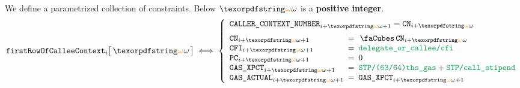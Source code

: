 We define a parametrized collection of constraints. Below $\relof$ is a \textbf{positive integer}. %
\[
	\firstRowOfCallee {i}{\relof}
	\iff
	\left\{ \begin{array}{lcl}
		\multicolumn{3}{l}{\caller  _{i + \relof + 1}          =          \cn  _{i + \relof}}                \vspace{2mm} \\
		\cn                         _{i + \relof + 1} & \!\!\! = \!\!\! & \cnCn_{i + \relof}                 \\
		\cfi                        _{i + \relof + 1} & \!\!\! = \!\!\! & \locDelegateOrCalleeCfi            \\
		\pc                         _{i + \relof + 1} & \!\!\! = \!\!\! & 0                                  \\
		\gasExpected                _{i + \relof + 1} & \!\!\! = \!\!\! & \locStpGasPoop + \locStpGasStipend \\
		\gasActual                  _{i + \relof + 1} & \!\!\! = \!\!\! & \gasExpected   _{i + \relof + 1}   \\
	\end{array} \right.
\]

